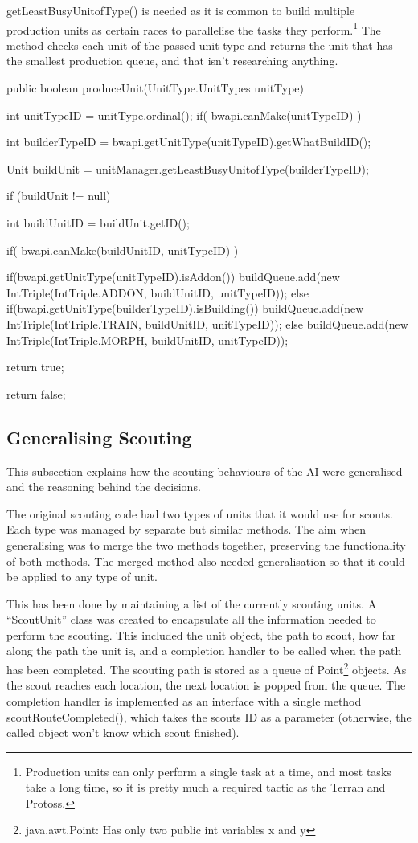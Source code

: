\documentclass[11pt,openright,a4paper]{report}
\begin{document}
getLeastBusyUnitofType() is needed as it is common to build multiple production units as certain races to parallelise the tasks they perform.\footnote{Production units can only perform a single task at a time, and most tasks take a long time, so it is pretty much a required tactic as the Terran and Protoss.} The method checks each unit of the passed unit type and returns the unit that has the smallest production queue, and that isn't researching anything.

\begin{Code}[frame=single,language=Java,tabsize=4,breaklines,breakatwhitespace,caption={The current method to produce any unit in the game. IntTriple is a custom type that simply contains three public integers.},label=produceUnit]
public boolean produceUnit(UnitType.UnitTypes unitType){
	int unitTypeID = unitType.ordinal();
	if( bwapi.canMake(unitTypeID) ){
		int builderTypeID = bwapi.getUnitType(unitTypeID).getWhatBuildID();
		
        Unit buildUnit = unitManager.getLeastBusyUnitofType(builderTypeID);
		
		if (buildUnit != null){
			int buildUnitID = buildUnit.getID();
			
			if( bwapi.canMake(buildUnitID, unitTypeID) ){					
				if(bwapi.getUnitType(unitTypeID).isAddon()){
					buildQueue.add(new IntTriple(IntTriple.ADDON, buildUnitID, unitTypeID));
				}
				else if(bwapi.getUnitType(builderTypeID).isBuilding()){
					buildQueue.add(new IntTriple(IntTriple.TRAIN, buildUnitID, unitTypeID));
				}
				else{
					buildQueue.add(new IntTriple(IntTriple.MORPH, buildUnitID, unitTypeID));
				}
				
				return true;
			}
		}
	}
	return false;
}
\end{Code}

\subsection{Generalising Scouting}
This subsection explains how the scouting behaviours of the AI were generalised and the reasoning behind the decisions.

The original scouting code had two types of units that it would use for scouts. Each type was managed by separate but similar methods. The aim when generalising was to merge the two methods together, preserving the functionality of both methods. The merged method also needed generalisation so that it could be applied to any type of unit.

This has been done by maintaining a list of the currently scouting units. A ``ScoutUnit'' class was created to encapsulate all the information needed to perform the scouting. This included the unit object, the path to scout, how far along the path the unit is, and a completion handler to be called when the path has been completed. The scouting path is stored as a queue of Point\footnote{java.awt.Point: Has only two public int variables x and y} objects. As the scout reaches each location, the next location is popped from the queue. The completion handler is implemented as an interface with a single method scoutRouteCompleted(), which takes the scouts ID as a parameter (otherwise, the called object won't know which scout finished).
\end{document}
